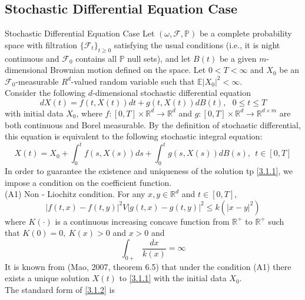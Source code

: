 \documentclass[unknownkeysallowed, compress]{beamer}
\theoremstyle{plain}
\begin{document}
\subsection{Stochastic Differential Equation Case}
\begin{frame}[allowframebreaks]{Stochastic Differential Equation Case}
Let $(\omega,\mathcal{F},\mathbb{P})$ be a complete probability space with filtration $\{\mathcal{F}_t\}_{t\geq 0}$ satisfying the usual conditions (i.e., it is night continuous and $\mathcal{F}_0$ contains all $\mathbb{P}$ null sets), and let $B(t)$ be a given $m$-dimensional Brownian motion defined on the space. Let $0<T<\infty$ and $X_0$ be an $\mathcal{F}_0$-measurable $R^d$-valued random variable such that $\mathbb{E}|X_0|^2<\infty$.\\
Consider the following $d$-dimensional stochastic differential equation
\begin{equation}\label{3.1.1}
dX(t) = f(t,X(t))dt+g(t,X(t))dB(t),~~~0\leq t\leq T
\end{equation}
with initial data $X_0$, where $f:[0,T]\times\mathbb{R}^d\rightarrow\mathbb{R}^d$ and $g:[0,T]\times\mathbb{R}^d\rightarrow\mathbb{R}^{d\times m}$ are both continuous  and Borel measurable. By the definition of stochastic differential, this equation is equivalent to the following stochastic integral equation:
\begin{equation}\label{3.1.2}
X(t) = X_0+\int_0^tf(s,X(s))ds+\int_0^tg(s,X(s))dB(s),~~t\in[0,T]
\end{equation}
In order to guarantee the existence and uniqueness of the solution tp \eqref{3.1.1}, we impose a condition on the coefficient function.\\

(A1) Non - Liochitz condition. For any $x,y\in\mathbb{R}^d$ and $t\in[0,T]$,
$$
\bigg|f(t,x)-f(t,y)\bigg|^2V\bigg|g(t,x)-g(t,y)\bigg|^2\leq k(\bigg|x-y\bigg|^2)
$$
where $K(\cdot)$ is a continuous increasing concave function from $\mathbb{R}^+$ to $\mathbb{R}^+$ such that $K(0) = 0,~K(x)>0$ and $x>0$ and
$$
\int_{0+}\frac{dx}{k(x)} = \infty
$$
It is known from (Mao, 2007, theorem 6.5) that under the condition (A1) there exists a unique solution $X(t)$ to \eqref{3.1.1} with the initial data $X_0$.\\
The standard form of \eqref{3.1.2} is


\end{frame}
\end{document}
